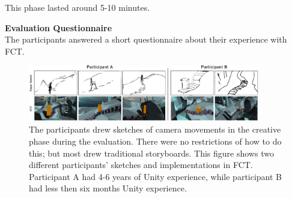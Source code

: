 This phase lasted around 5-10 minutes.

\textbf{Evaluation Questionnaire}\\
The participants answered a short questionnaire about their experience with FCT.

\begin{figure}[htbp]
\centering
\includegraphics[width=0.9\textwidth]{Pics/Sketching_FramingsNew}
\caption{The participants drew sketches of camera movements in the creative phase during the evaluation. There were no restrictions of how to do this; but most drew traditional storyboards. This figure shows two different participants' sketches and implementations in FCT. Participant A had 4-6 years of Unity experience, while participant B had less then six months Unity experience.}
\label{fig:Sketching_Framings}
\end{figure}